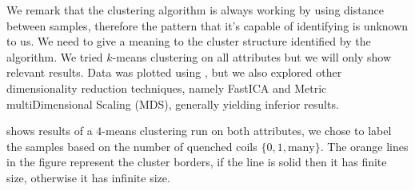 We remark that the clustering algorithm is always working by using distance between samples,
therefore the pattern that it's capable of identifying is unknown to us. We need to give a meaning
to the cluster structure identified by the algorithm. We tried $k$-means clustering on all
attributes but we will only show relevant results. Data was plotted using \pca, but we also explored
other dimensionality reduction techniques, namely FastICA and Metric multiDimensional Scaling (MDS),
generally yielding inferior results.

 shows results of a $4$-means clustering run on both attributes, we chose
to label the samples based on the number of quenched coils $\{0, 1, \text{many}\}$. The orange lines
in the figure represent the cluster borders, if the line is solid then it has finite size, otherwise
it has infinite size.

